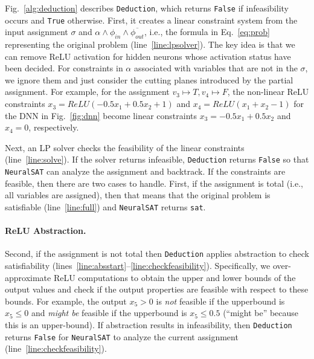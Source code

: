 \documentclass[oneside,11pt,dvipsnames]{book}
\numberwithin{equation}{section}
\theoremstyle{definition}
\theoremstyle{remark}
\newcommand{\hd}[1]{\iftoggle{usecomment}{{\color{blue}{[HD]: #1}}}{}}
\newcommand{\tool}{\texttt{NeuralSAT}}
\begin{document}


Fig.~\ref{alg:deduction} describes \texttt{Deduction}, which returns \texttt{False} if infeasibility occurs and  \texttt{True} otherwise.
First, it creates a linear constraint system from the input assignment $\sigma$ and $\alpha \land \phi_{in} \land \overline{\phi_{out}}$, i.e., the formula in Eq.~\ref{eq:prob} representing the original problem  (line~\ref{line:lpsolver}).
The key idea is that we can remove ReLU activation for hidden neurons whose activation status have been decided.
For constraints in $\alpha$ associated with variables that are not in the $\sigma$,  we ignore them and just consider the cutting planes introduced by the partial assignment.
For example, for the assignment $v_3\mapsto T, v_4 \mapsto F$, the non-linear ReLU constraints $x_3=ReLU(-0.5x_1+0.5x_2+1)$ and  $x_4=ReLU(x_1+x_2-1)$ for the DNN in Fig.~\ref{fig:dnn} become linear constraints $x_3=-0.5x_1+0.5x_2$ and $x_4=0$, respectively.

Next, an LP solver checks the feasibility of the linear constraints (line~\ref{line:solve}).
If the solver returns infeasible,  \texttt{Deduction} returns \texttt{False} so that \tool{} can analyze the assignment and backtrack.
If the constraints are feasible, then there are two cases to handle. First, if the assignment is total (i.e., all variables are assigned), then that means that the original problem is satisfiable (line~\ref{line:full}) and \tool{} returns \texttt{sat}.

\paragraph{ReLU Abstraction.} Second, if the assignment is not total then \texttt{Deduction} applies abstraction to check satisfiability (lines~\ref{line:absstart}--\ref{line:checkfeasibility}).
Specifically, we over-approximate  ReLU computations to obtain the upper and lower bounds of the output values and check if the output properties are feasible with respect to these bounds. For example, the output $x_5 > 0$ is \emph{not} feasible if the upperbound is $x_5 \le 0$ and \emph{might be} feasible if the upperbound is $x_5 \le 0.5$ (``might be'' because this is an upper-bound). If abstraction results in infeasibility, then \texttt{Deduction} returns \texttt{False} for \tool{} to analyze the current assignment (line~\ref{line:checkfeasibility}).
\end{document}
